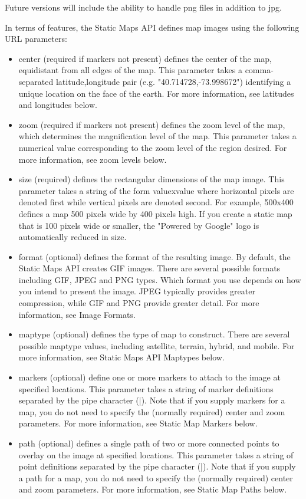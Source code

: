 \documentclass{article}
\begin{document}
Future versions will include the ability to handle png files in addition to jpg.

\noindent In terms of features, the Static Maps API defines map images using the following URL parameters:
\begin{itemize}
    \item center (required if markers not present) defines the center of the map, equidistant from all edges of the map. This parameter takes a comma-separated {latitude,longitude} pair (e.g. "40.714728,-73.998672") identifying a unique location on the face of the earth. For more information, see latitudes and longitudes below.
    \item zoom (required if markers not present) defines the zoom level of the map, which determines the magnification level of the map. This parameter takes a numerical value corresponding to the zoom level of the region desired. For more information, see zoom levels below.
    \item size (required) defines the rectangular dimensions of the map image. This parameter takes a string of the form valuexvalue where horizontal pixels are denoted first while vertical pixels are denoted second. For example, 500x400 defines a map 500 pixels wide by 400 pixels high. If you create a static map that is 100 pixels wide or smaller, the "Powered by Google" logo is automatically reduced in size.
    \item format (optional) defines the format of the resulting image. By default, the Static Maps API creates GIF images. There are several possible formats including GIF, JPEG and PNG types. Which format you use depends on how you intend to present the image. JPEG typically provides greater compression, while GIF and PNG provide greater detail. For more information, see Image Formats.
    \item maptype (optional) defines the type of map to construct. There are several possible maptype values, including satellite, terrain, hybrid, and mobile. For more information, see Static Maps API Maptypes below.
    \item markers (optional) define one or more markers to attach to the image at specified locations. This parameter takes a string of marker definitions separated by the pipe character (|). Note that if you supply markers for a map, you do not need to specify the (normally required) center and zoom parameters. For more information, see Static Map Markers below.
    \item path (optional) defines a single path of two or more connected points to overlay on the image at specified locations. This parameter takes a string of point definitions separated by the pipe character (|). Note that if you supply a path for a map, you do not need to specify the (normally required) center and zoom parameters. For more information, see Static Map Paths below.

\end{itemize}
\end{document}
